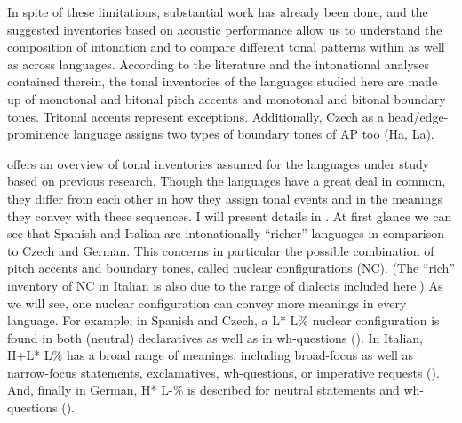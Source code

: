 In spite of these limitations, substantial work has already been done, and the suggested inventories based on acoustic performance allow us to understand the composition of intonation and to compare different tonal patterns within as well as across languages. According to the literature and the intonational analyses contained therein, the tonal inventories of the languages studied here are made up of monotonal and bitonal pitch accents and monotonal and bitonal boundary tones. Tritonal accents represent exceptions. Additionally, Czech as a head/edge-prominence language assigns two types of boundary tones of AP too (Ha, La).\largerpage



 offers an overview of tonal inventories assumed for the languages under study based on previous research. Though the languages have a great deal in common, they differ from each other in how they assign tonal events and in the meanings they convey with these sequences. I will present details in . At first glance we can see that Spanish and Italian are intonationally “richer” languages in comparison to Czech and German. This concerns in particular the possible combination of pitch accents and boundary tones, called nuclear configurations (NC). (The “rich” inventory of NC in Italian is also due to the range of dialects included here.) As we will see, one nuclear configuration can convey more meanings in every language. For example, in Spanish and Czech, a L* L\% nuclear configuration is found in both (neutral) declaratives as well as in wh-questions (\citealt{Estebas-VilaplanaPrieto2010, Pešková2017}). In Italian, H+L* L\% has a broad range of meanings, including broad-focus as well as narrow-focus statements, exclamatives, wh-questions, or imperative requests (\citealt{GiliFivelaEtAl2015}). And, finally in German, H* L-\% is described for neutral statements and wh-questions (\citealt{GriceBaumann2002}).


